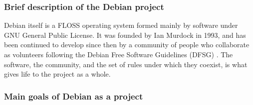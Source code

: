 \documentclass[11pt]{article} %
\begin{document}
\subsubsection{Brief description of the Debian project}

Debian itself is a FLOSS operating system formed mainly by software under GNU General Public License. It was founded by Ian Murdock in 1993, and has been continued to develop since then by a community of people who collaborate as volunteers following the Debian Free Software Guidelines (DFSG) \cite{Perens et al:2004bp}. The software, the community, and the set of rules under which they coexist, is what gives life to the project as a whole.

\subsubsection{Main goals of Debian as a project}
\end{document}
